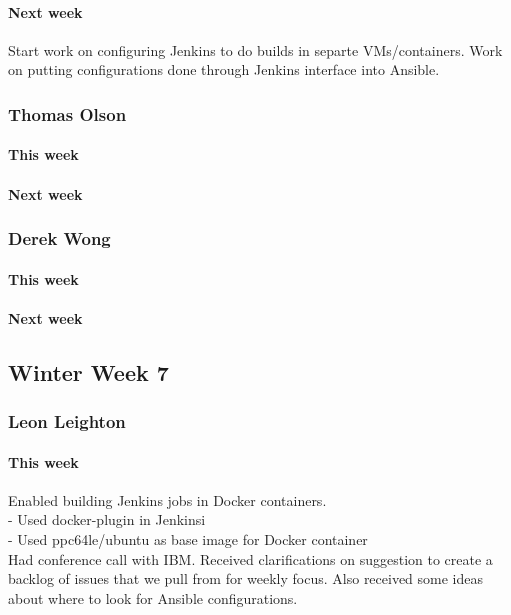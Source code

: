 \documentclass[10pt,letterpaper,onecolumn,draftclsnofoot]{IEEEtran}
\begin{document}
\paragraph{Next week}Start work on configuring Jenkins to do builds in separte VMs/containers.  
Work on putting configurations done through Jenkins interface into Ansible.


\subsubsection{Thomas Olson}
\paragraph{This week}
\paragraph{Next week}


\subsubsection{Derek Wong}
\paragraph{This week}
\paragraph{Next week}


\subsection{Winter Week 7}
\subsubsection{Leon Leighton}
\paragraph{This week}Enabled building Jenkins jobs in Docker containers.\\
- Used docker-plugin in Jenkinsi\\
- Used ppc64le/ubuntu as base image for Docker container \\ 
Had conference call with IBM. Received clarifications on suggestion to create a backlog of issues that we pull from for weekly focus. Also received some ideas about where to look for Ansible configurations.  
\end{document}
